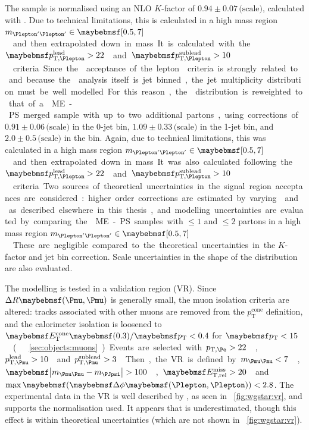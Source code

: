 The \sherpa sample is normalised using an NLO $K$-factor of $0.94\pm0.07\,\text{(scale)}$, 
calculated with \mcfm. Due to technical limitations, this is calculated in a high mass 
region \unit{$m_{\HepProcess{\Plepton'\Plepton'}} \in \hardrange{0.5,7}$}{\GeV} and then 
extrapolated down in mass. It is calculated with the \unit{$\ptleadlep > 22$}{\GeV} and 
\unit{$\ptsubleadlep > 10$}{\GeV} criteria.

Since the \Wgstar acceptance of the lepton \pt criteria is strongly related to \njets and 
because the \HWW analysis itself is jet binned, the jet multiplicity distribution must be 
well modelled. For this reason, the \njets distribution is reweighted to that of a \sherpa 
ME-PS merged sample with up to two additional partons, using corrections of 
$0.91\pm0.06\,\text{(scale)}$ in the 0-jet bin, $1.09\pm0.33\,\text{(scale)}$ in the 1-jet 
bin, and $2.0\pm0.5\,\text{(scale)}$ in the \twojet bin. Again, due to technical 
limitations, this was calculated in a high mass region 
\unit{$m_{\HepProcess{\Plepton'\Plepton'}} \in \hardrange{0.5,7}$}{\GeV} and then 
extrapolated down in mass. It was also calculated following the 
\unit{$\ptleadlep > 22$}{\GeV} and \unit{$\ptsubleadlep > 10$}{\GeV} criteria.

Two sources of theoretical uncertainties in the signal region acceptances are considered: 
higher order corrections are estimated by varying \mur and \muf as described elsewhere in 
this thesis, and modelling uncertainties are evaluated by comparing the \sherpa ME-PS 
samples with $\leq\!1$ and $\leq\!2$ partons in a high mass region 
\unit{$m_{\HepProcess{\Plepton'\Plepton'}} \in \hardrange{0.5,7}$}{\GeV}. These are 
negligible compared to the theoretical uncertainties in the $K$-factor and jet bin 
correction. Scale uncertainties in the shape of the \mt distribution are also evaluated.

The \Wgstar modelling is tested in a \HepProcess{\Wgstar \HepTo \Pe\Pnu\Pmu\Pmu} validation 
region (VR). Since $\Delta R\parenths{\Pmu,\Pmu}$ is generally small, the muon isolation 
criteria are altered: tracks associated with other muons are removed from the 
$p_{\text{T}}^{\text{cone}}$ definition, and the calorimeter isolation is loosened to 
$\etcone{0.3}/\pt < 0.4$ for \unit{$\pt < 15$}{\GeV} (\cf \Section~\ref{sec:objects:muons}).
Events are selected with \unit{$p_{\text{T,\Pe}} > 22$}{\GeV}, 
\unit{$p_{\text{T,\Pmu}}^{\text{lead}} > 10$}{\GeV} and 
\unit{$p_{\text{T,\Pmu}}^{\text{sublead}} > 3$}{\GeV}. 
Then, the VR is defined by \unit{$m_{\HepProcess{\Pmu\Pmu}} < 7$}{\GeV}, 
\unit{$\mods{m_{\HepProcess{\Pmu\Pmu}} - m_{\PJpsi}} > 100$}{\MeV}, 
\unit{$\metrel > 20$}{\GeV} and $\max\parenths{\dphill} < 2.8$.
The experimental data in the VR is well described by \sherpa, as seen in 
\Figure~\ref{fig:wgstar:vr}, and supports the normalisation used. It appears that \njets is 
underestimated, though this effect is within theoretical uncertainties (which are not shown 
in \Figure~\ref{fig:wgstar:vr}).

